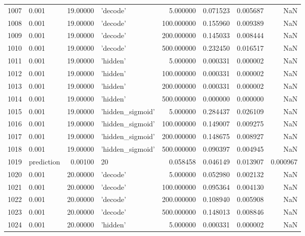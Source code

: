 \documentclass[10pt,a4paper]{article}
\begin{document}
\begin{tabular}{llrlrrrr}
1007 &       0.001 &  19.00000 &           'decode' &    5.000000 &  0.071523 &  0.005687 &       NaN \\
1008 &       0.001 &  19.00000 &           'decode' &  100.000000 &  0.155960 &  0.009389 &       NaN \\
1009 &       0.001 &  19.00000 &           'decode' &  200.000000 &  0.145033 &  0.008444 &       NaN \\
1010 &       0.001 &  19.00000 &           'decode' &  500.000000 &  0.232450 &  0.016517 &       NaN \\
1011 &       0.001 &  19.00000 &           'hidden' &    5.000000 &  0.000331 &  0.000002 &       NaN \\
1012 &       0.001 &  19.00000 &           'hidden' &  100.000000 &  0.000331 &  0.000002 &       NaN \\
1013 &       0.001 &  19.00000 &           'hidden' &  200.000000 &  0.000331 &  0.000002 &       NaN \\
1014 &       0.001 &  19.00000 &           'hidden' &  500.000000 &  0.000000 &  0.000000 &       NaN \\
1015 &       0.001 &  19.00000 &   'hidden\_sigmoid' &    5.000000 &  0.284437 &  0.026109 &       NaN \\
1016 &       0.001 &  19.00000 &   'hidden\_sigmoid' &  100.000000 &  0.149007 &  0.009275 &       NaN \\
1017 &       0.001 &  19.00000 &   'hidden\_sigmoid' &  200.000000 &  0.148675 &  0.008927 &       NaN \\
1018 &       0.001 &  19.00000 &   'hidden\_sigmoid' &  500.000000 &  0.090397 &  0.004945 &       NaN \\
1019 &  prediction &   0.00100 &                 20 &    0.058458 &  0.046149 &  0.013907 &  0.000967 \\
1020 &       0.001 &  20.00000 &           'decode' &    5.000000 &  0.052980 &  0.002132 &       NaN \\
1021 &       0.001 &  20.00000 &           'decode' &  100.000000 &  0.095364 &  0.004130 &       NaN \\
1022 &       0.001 &  20.00000 &           'decode' &  200.000000 &  0.108940 &  0.005908 &       NaN \\
1023 &       0.001 &  20.00000 &           'decode' &  500.000000 &  0.148013 &  0.008846 &       NaN \\
1024 &       0.001 &  20.00000 &           'hidden' &    5.000000 &  0.000331 &  0.000002 &       NaN \\

\end{tabular}
\end{document}
